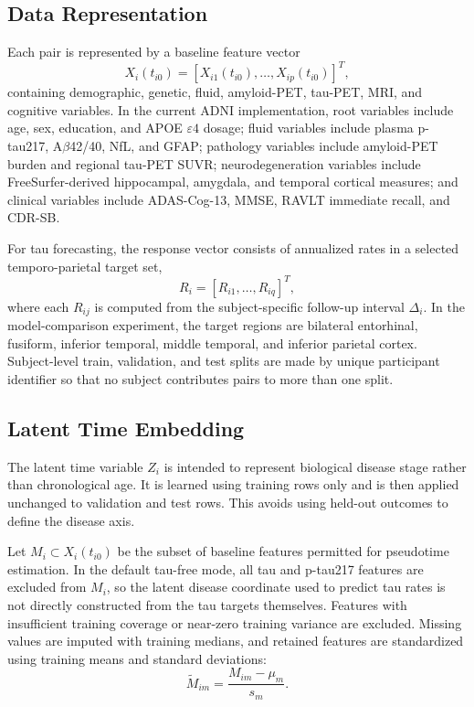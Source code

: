 \subsection{Data Representation}

Each pair is represented by a baseline feature vector
\begin{equation}
X_i(t_{i0})
=
\left[
X_{i1}(t_{i0}), \ldots, X_{ip}(t_{i0})
\right]^T,
\end{equation}
containing demographic, genetic, fluid, amyloid-PET, tau-PET, MRI, and
cognitive variables. In the current ADNI implementation, root variables include
age, sex, education, and APOE $\varepsilon 4$ dosage; fluid variables include
plasma p-tau217, A$\beta$42/40, NfL, and GFAP; pathology variables include
amyloid-PET burden and regional tau-PET SUVR; neurodegeneration variables
include FreeSurfer-derived hippocampal, amygdala, and temporal cortical
measures; and clinical variables include ADAS-Cog-13, MMSE, RAVLT immediate
recall, and CDR-SB.

For tau forecasting, the response vector consists of annualized rates in a
selected temporo-parietal target set,
\begin{equation}
R_i =
\left[
R_{i1}, \ldots, R_{iq}
\right]^T,
\end{equation}
where each $R_{ij}$ is computed from the subject-specific follow-up interval
$\Delta_i$. In the model-comparison experiment, the target regions are
bilateral entorhinal, fusiform, inferior temporal, middle temporal, and inferior
parietal cortex. Subject-level train, validation, and test splits are made by
unique participant identifier so that no subject contributes pairs to more than
one split.

\subsection{Latent Time Embedding}

The latent time variable $Z_i$ is intended to represent biological disease
stage rather than chronological age. It is learned using training rows only and
is then applied unchanged to validation and test rows. This avoids using
held-out outcomes to define the disease axis.

Let $M_i \subset X_i(t_{i0})$ be the subset of baseline features permitted for
pseudotime estimation. In the default tau-free mode, all tau and p-tau217
features are excluded from $M_i$, so the latent disease coordinate used to
predict tau rates is not directly constructed from the tau targets themselves.
Features with insufficient training coverage or near-zero training variance are
excluded. Missing values are imputed with training medians, and retained
features are standardized using training means and standard deviations:
\begin{equation}
\widetilde{M}_{im}
=
\frac{M_{im}-\mu_m}{s_m}.
\end{equation}

